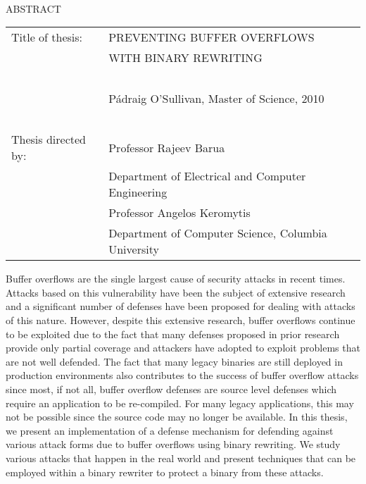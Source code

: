 
\hbox{\ }

\renewcommand{\baselinestretch}{1}
\small \normalsize

\begin{center}
\large{{ABSTRACT}} 

\vspace{3em} 

\end{center}
\hspace{-.15in}
\begin{tabular}{ll}
Title of thesis:    & {\large  PREVENTING BUFFER OVERFLOWS}\\
&				      {\large  WITH BINARY REWRITING} \\
\ \\
&                          {\large  P\'{a}draig O'Sullivan, Master of Science, 2010} \\
\ \\
Thesis directed by: & {\large  Professor Rajeev Barua} \\
&  				{\large	 Department of Electrical and Computer Engineering} \\
&  				{\large	 Professor Angelos Keromytis} \\
&  				{\large	 Department of Computer Science, Columbia University} \\
\end{tabular}

\vspace{3em}

\renewcommand{\baselinestretch}{2}
\large \normalsize

Buffer overflows are the single largest cause of security attacks in recent times. Attacks based on
this vulnerability have been the subject of extensive research and a significant number of defenses
have been proposed for dealing with attacks of this nature. However, despite this extensive
research, buffer overflows continue to be exploited due to the fact that many defenses proposed in
prior research provide only partial coverage and attackers have adopted to exploit problems that are
not well defended. The fact that many legacy binaries are still deployed in production environments
also contributes to the success of buffer overflow attacks since most, if not all, buffer overflow
defenses are source level defenses which require an application to be re-compiled. For many legacy
applications, this may not be possible since the source code may no longer be available. In this
thesis, we present an implementation of a defense mechanism for defending against various attack
forms due to buffer overflows using binary rewriting. We study various attacks that happen in the
real world and present techniques that can be employed within a binary rewriter to protect a binary
from these attacks.

